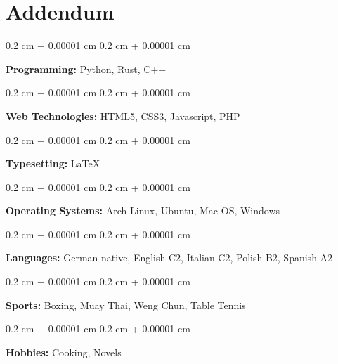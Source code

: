 \documentclass[10pt, letterpaper]{article}
\newenvironment{onecolentry}{
    \begin{adjustwidth}{
        0.2 cm + 0.00001 cm
    }{
        0.2 cm + 0.00001 cm
    }
}{
    \end{adjustwidth}
}
\begin{document}
\section{Addendum}  
\begin{onecolentry}
	\textbf{Programming:} Python, Rust, C++
\end{onecolentry}
\vspace{0.2 cm}
\begin{onecolentry}
	\textbf{Web Technologies:} HTML5, CSS3, Javascript, PHP
\end{onecolentry}
\vspace{0.2 cm}
\begin{onecolentry}
	\textbf{Typesetting:} \LaTeX
\end{onecolentry}
\vspace{0.2 cm}
\begin{onecolentry}
	\textbf{Operating Systems:} Arch Linux, Ubuntu, Mac OS, Windows
\end{onecolentry}
\vspace{0.2 cm}
\begin{onecolentry}
	\textbf{Languages:} German native, English C2, Italian C2, Polish B2, Spanish A2
\end{onecolentry}
\vspace{0.2 cm}
\begin{onecolentry}
	\textbf{Sports:} Boxing, Muay Thai, Weng Chun, Table Tennis
\end{onecolentry}
\vspace{0.2 cm}
\begin{onecolentry}
	\textbf{Hobbies:} Cooking, Novels
\end{onecolentry}
\end{document}
